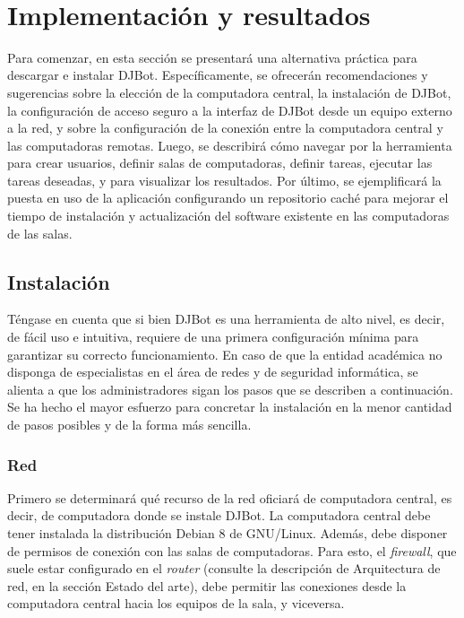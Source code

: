 \documentclass[a4paper,12pt]{article}
\begin{document}
\newpage\\
\section{Implementación y resultados}
\label{sec:orgheadline29}

Para comenzar, en esta sección se presentará una alternativa práctica para descargar e instalar DJBot. Específicamente, se ofrecerán recomendaciones y sugerencias sobre la elección de la computadora central, la instalación de DJBot, la configuración de acceso seguro a la interfaz de DJBot desde un equipo externo a la red, y sobre la configuración de la conexión entre la computadora central y las computadoras remotas. Luego, se describirá cómo navegar por la herramienta para crear usuarios, definir salas de computadoras, definir tareas, ejecutar las tareas deseadas, y para visualizar los resultados. Por último, se ejemplificará la puesta en uso de la aplicación configurando un repositorio caché para mejorar el tiempo de instalación y actualización del software existente en las computadoras de las salas.\\

\subsection{Instalación}
\label{sec:orgheadline26}

Téngase en cuenta que si bien DJBot es una herramienta de alto nivel, es decir, de fácil uso e intuitiva, requiere de una primera configuración mínima para garantizar su correcto funcionamiento. En caso de que la entidad académica no disponga de especialistas en el área de redes y de seguridad informática, se alienta a que los administradores sigan los pasos que se describen a continuación. Se ha hecho el mayor esfuerzo para concretar la instalación en la menor cantidad de pasos posibles y de la forma más sencilla.\\

\subsubsection{Red}
\label{sec:orgheadline20}

Primero se determinará qué recurso de la red oficiará de computadora central, es decir, de computadora donde se instale DJBot. La computadora central debe tener instalada la distribución Debian 8 de GNU/Linux. Además, debe disponer de permisos de conexión con las salas de computadoras. Para esto, el \emph{firewall}, que suele estar configurado en el \emph{router} (consulte la descripción de Arquitectura de red, en la sección Estado del arte), debe permitir las conexiones desde la computadora central hacia los equipos de la sala, y viceversa.\\
\end{document}
